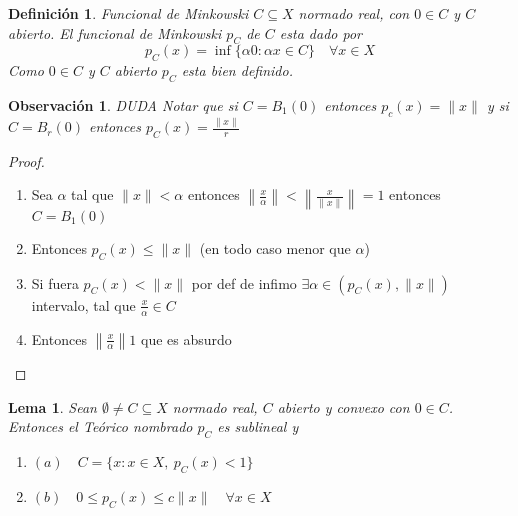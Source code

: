 \documentclass[10pt]{extarticle}
\theoremstyle{break}
\newtheorem{lemma}[theorem]{Lema}
\newtheorem*{remark}{Observación}
\newtheorem{definition}{Definición}[section]
\theoremstyle{definition}
\begin{document}
\begin{definition} Funcional de Minkowski
$C\subseteq X$ normado real, con $0\in C$ y $C$ abierto. El \emph{funcional de Minkowski} $p_{C}$ de $C$ esta dado por 
$$p_{C}(x)=\inf \{ \alpha 0:\alpha x\in C \}\quad \forall x\in X$$
Como $0\in C$ y $C$ abierto $p_{C}$ esta bien definido.
\end{definition}


\begin{remark} DUDA
Notar que si $C=B_{1}(0)$ entonces $p_{c}(x)=\lVert x \rVert$ y si $C=B_{r}(0)$ entonces $p_{C}(x)=\frac{\lVert x \rVert}{r}$
\end{remark}


\begin{proof}
\begin{enumerate}
\item
Sea $\alpha$ tal que $\lVert x \rVert < \alpha$ entonces $\left\lVert \frac{x}{\alpha } \right\rVert<\left\lVert \frac{x}{\lVert x \rVert} \right\rVert=1$ entonces $C=B_{1}(0)$
\item
Entonces $p_{C}(x)\leq \lVert x \rVert$ (en todo caso menor que $\alpha$)
\item
Si fuera $p_{C}(x)<\lVert x \rVert$ por def de infimo $\exists \alpha \in (p_{C}(x),\lVert x \rVert)$ intervalo, tal que $\frac{x}{\alpha }\in C$
\item
Entonces $\left\lVert \frac{x}{\alpha } \right\rVert1$ que es absurdo
\end{enumerate}
\end{proof}

\begin{lemma}
Sean $\emptyset \neq C\subseteq X$ normado real, $C$ abierto y convexo con $0\in C$. Entonces el Teórico nombrado $p_{C}$ es sublineal y
	\begin{enumerate}
		\item $(a) \quad C=\{ x:x\in X, \ p_{C}(x)<1 \}$
		\item $(b)\quad 0\leq p_{C}(x)\leq c\lVert x \rVert \quad\forall x\in X$
	\end{enumerate}
\end{lemma}
\end{document}
